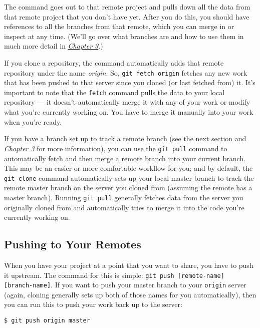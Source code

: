 \documentclass[a4paper]{book}
\newcounter{tab}[chapter]
\newcommand{\prechap}{Chapter }
\newcommand{\postchap}{}
\newcommand{\chapref}[1]{\hyperref[chap:#1]{\prechap #1\postchap}}
\begin{document}
The command goes out to that remote project and pulls down all the data from that remote project that you don't have yet. After you do this, you should have references to all the branches from that remote, which you can merge in or inspect at any time. (We'll go over what branches are and how to use them in much more detail in \emph{\chapref{3}}.)

If you clone a repository, the command automatically adds that remote repository under the name \emph{origin}. So, \texttt{git fetch origin} fetches any new work that has been pushed to that server since you cloned (or last fetched from) it. It's important to note that the \texttt{fetch} command pulls the data to your local repository --- it doesn't automatically merge it with any of your work or modify what you're currently working on. You have to merge it manually into your work when you're ready.

If you have a branch set up to track a remote branch (see the next section and \emph{\chapref{3}} for more information), you can use the \texttt{git pull} command to automatically fetch and then merge a remote branch into your current branch. This may be an easier or more comfortable workflow for you; and by default, the \texttt{git clone} command automatically sets up your local master branch to track the remote master branch on the server you cloned from (assuming the remote has a master branch). Running \texttt{git pull} generally fetches data from the server you originally cloned from and automatically tries to merge it into the code you're currently working on.

\subsection{Pushing to Your Remotes}\label{pushing-to-your-remotes}

When you have your project at a point that you want to share, you have to push it upstream. The command for this is simple: \texttt{git push {[}remote-name{]} {[}branch-name{]}}. If you want to push your master branch to your \texttt{origin} server (again, cloning generally sets up both of those names for you automatically), then you can run this to push your work back up to the server:

\begin{shaded}\begin{verbatim}
$ git push origin master
\end{verbatim}\end{shaded}
\end{document}
